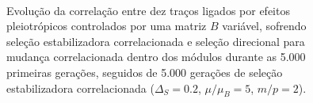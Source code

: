 \begin{figure}[htbp]
  \vspace{-18pt}
  \vspace{11pt}
  \\
  \caption{Evolução da correlação entre dez traços ligados por efeitos
  pleiotrópicos controlados por uma matriz $B$ variável, sofrendo seleção estabilizadora correlacionada e seleção
  direcional para mudança correlacionada dentro dos módulos
  durante as 5.000 primeiras gerações, seguidos de 5.000 gerações de
  seleção estabilizadora correlacionada ($\Delta_S = 0.2$, $\mu/\mu_B=5$, $m/p=2$).}
  \label{posselecao}
\end{figure}



